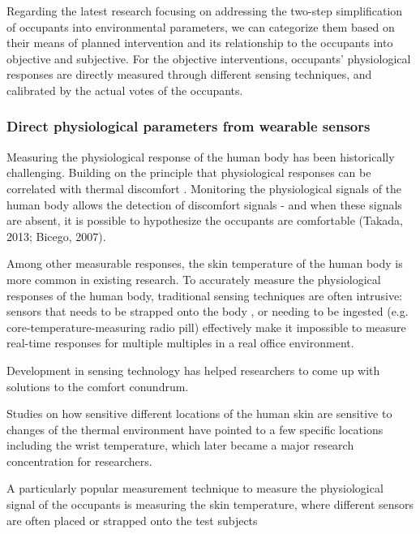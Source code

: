 Regarding the latest research focusing on addressing the two-step simplification of occupants into environmental parameters, we can categorize them based on their means of planned intervention and its relationship to the occupants into objective and subjective. For the objective interventions, occupants' physiological responses are directly measured through different sensing techniques, and calibrated by the actual votes of the occupants. 

\subsubsection{Direct physiological parameters from wearable sensors}
Measuring the physiological response of the human body has been historically challenging. Building on the principle that physiological responses can be correlated with thermal discomfort \cite{huizenga_skin_2004}. Monitoring the physiological signals of the human body allows the detection of discomfort signals - and when these signals are absent, it is possible to hypothesize the occupants are comfortable (Takada, 2013; Bicego, 2007). 


Among other measurable responses, the skin temperature of the human body is more common in existing research. To accurately measure the physiological responses of the human body, traditional sensing techniques are often intrusive: sensors that needs to be strapped onto the body \cite{mccarthy_validation_2016}, or needing to be ingested (e.g. core-temperature-measuring radio pill) effectively make it impossible to measure real-time responses for multiple multiples in a real office environment. 

Development in sensing technology has helped researchers to come up with solutions to the comfort conundrum. 

Studies on how sensitive different locations of the human skin are sensitive to changes of the thermal environment have pointed to a few specific locations including the wrist temperature, which later became a major research concentration for researchers\cite{choi_cobi:_2010}. 

A particularly popular measurement technique to measure the physiological signal of the occupants is measuring the skin temperature, where different sensors are often placed or strapped onto the test subjects\cite{}

